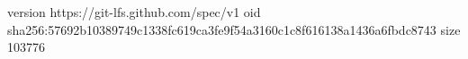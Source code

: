 version https://git-lfs.github.com/spec/v1
oid sha256:57692b10389749c1338fc619ca3fe9f54a3160c1c8f616138a1436a6fbdc8743
size 103776
